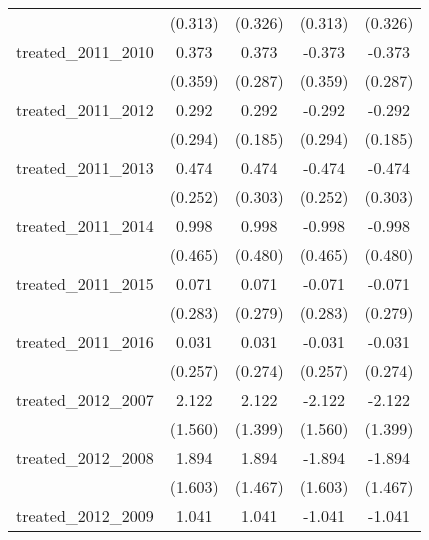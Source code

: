 {\begin{tabular}{l*{4}{c}}
            &     (0.313)         &     (0.326)         &     (0.313)         &     (0.326)         \\
[1em]
treated\_2011\_2010&       0.373         &       0.373         &      -0.373         &      -0.373         \\
            &     (0.359)         &     (0.287)         &     (0.359)         &     (0.287)         \\
[1em]
treated\_2011\_2012&       0.292         &       0.292         &      -0.292         &      -0.292         \\
            &     (0.294)         &     (0.185)         &     (0.294)         &     (0.185)         \\
[1em]
treated\_2011\_2013&       0.474         &       0.474         &      -0.474         &      -0.474         \\
            &     (0.252)         &     (0.303)         &     (0.252)         &     (0.303)         \\
[1em]
treated\_2011\_2014&       0.998\sym{*}  &       0.998\sym{*}  &      -0.998\sym{*}  &      -0.998\sym{*}  \\
            &     (0.465)         &     (0.480)         &     (0.465)         &     (0.480)         \\
[1em]
treated\_2011\_2015&       0.071         &       0.071         &      -0.071         &      -0.071         \\
            &     (0.283)         &     (0.279)         &     (0.283)         &     (0.279)         \\
[1em]
treated\_2011\_2016&       0.031         &       0.031         &      -0.031         &      -0.031         \\
            &     (0.257)         &     (0.274)         &     (0.257)         &     (0.274)         \\
[1em]
treated\_2012\_2007&       2.122         &       2.122         &      -2.122         &      -2.122         \\
            &     (1.560)         &     (1.399)         &     (1.560)         &     (1.399)         \\
[1em]
treated\_2012\_2008&       1.894         &       1.894         &      -1.894         &      -1.894         \\
            &     (1.603)         &     (1.467)         &     (1.603)         &     (1.467)         \\
[1em]
treated\_2012\_2009&       1.041         &       1.041         &      -1.041         &      -1.041         \\

\end{tabular}}
